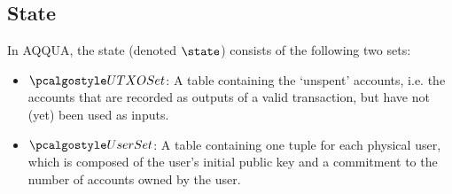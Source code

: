\subsection{State}
In AQQUA, the state (denoted $\state$) consists of the following two sets:
\begin{itemize}
\item $\utxoset$: A table containing the `unspent' accounts, i.e. the accounts that are recorded as outputs of a valid transaction, but 
have not (yet) been used as inputs.%
\item $\usersset$: A table containing one tuple for each physical user, which is composed of the user's initial public key and a commitment to the number of accounts owned by the user.
\end{itemize}